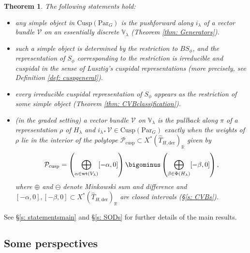 \documentclass{amsart}
\newtheorem{theorem}{Theorem}[subsection]
\theoremstyle{definition}
\theoremstyle{remark}
\numberwithin{equation}{section}
\newcommand{\der}{\mathrm{der}}
\newcommand{\mc}{\mathcal}
\newcommand{\R}{\mathbb{R}}
\newcommand{\wh}{\widehat}
\newcommand{\Par}{\mathrm{Par}}
\newcommand{\Cusp}{\mathrm{Cusp}}
\newcommand{\cusp}{\mathrm{cusp}}
\newcommand{\V}{\mathbb{V}}
\newcommand{\wt}{\mathrm{wt}}
\begin{document}
\begin{theorem}\label{thm:IntroIII}
The following statements hold:
\begin{itemize}
    \item any simple object in $\Cusp(\Par_G)$ is the pushforward along $i_\lambda$ of a vector bundle $\mc{V}$ on an essentially discrete $\V_{\lambda}$ (Theorem \ref{thm: Generators}).
    \item such a simple object is determined by the restriction to $BS_\phi$, and the representation of $S_\phi$ corresponding to the restriction is irreducible and cuspidal in the sense of Lusztig's cuspidal representations (more precisely, see Definition \ref{def: cuspgeneral}).
    \item every irreducible cuspidal representation of $S_\phi$ appears as the restriction of some simple object (Theorem \ref{thm: CVBclassification}).
    \item (in the graded setting) a vector bundle $\mc{V}$ on $\V_{\lambda}$ is the pullback along $\pi$ of a representation $\rho$ of $H_{\lambda}$ and $i_{\lambda\ast}\mc{V} \in \Cusp(\Par_G)$ exactly when the weights of $\rho$ lie in the interior of the polytope $\mc{P}_{\cusp} \subset X^{\ast}(\wh{T}_{H, \der})_{\R}$ given by
      \begin{equation*}
        \mc{P}_{\cusp} = \left(\bigoplus_{\alpha \in \wt(V_{\lambda})} [-\alpha, 0]\right) \bigominus \left(\bigoplus_{\beta \in \Phi(H_{\lambda})} [-\beta, 0]\right),
    \end{equation*}
where $\oplus$ and $\ominus$ denote Minkowski sum and difference and $[-\alpha, 0], [-\beta, 0] \subset X^{\ast}(\wh{T}_{H,\der})_{\R}$ are closed intervals (\S \ref{s: CVBs}).
\end{itemize} 
\end{theorem}

See \S \ref{s: statementsmain} and \S \ref{s: SODs} for further details of the main results. 

\subsection{Some perspectives}
\end{document}
